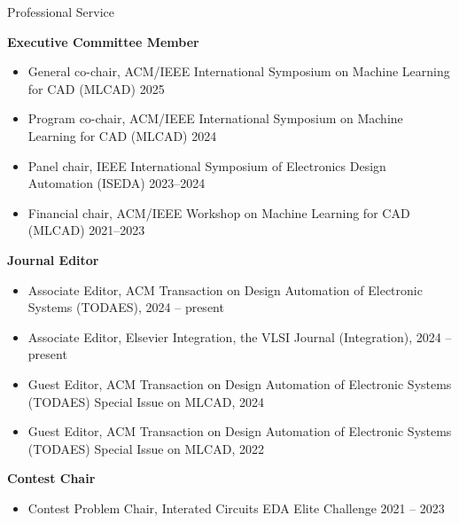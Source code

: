 
\begin{rSection}{Professional Service}

\textbf{Executive Committee Member}
\begin{itemize}
    \item General co-chair, ACM/IEEE International Symposium on Machine Learning for CAD (MLCAD) 2025
    \item Program co-chair, ACM/IEEE International Symposium on Machine Learning for CAD (MLCAD) 2024
    \item Panel chair, IEEE International Symposium of Electronics Design Automation (ISEDA) 2023--2024
    \item Financial chair, ACM/IEEE Workshop on Machine Learning for CAD (MLCAD) 2021--2023 
\end{itemize}

\textbf{Journal Editor}
\begin{itemize}
    \item Associate Editor, ACM Transaction on Design Automation of Electronic Systems (TODAES), 2024 -- present
    \item Associate Editor, Elsevier Integration, the VLSI Journal (Integration), 2024 -- present
    \item Guest Editor, ACM Transaction on Design Automation of Electronic Systems (TODAES) Special Issue on MLCAD, 2024
    \item Guest Editor, ACM Transaction on Design Automation of Electronic Systems (TODAES) Special Issue on MLCAD, 2022
\end{itemize}

\textbf{Contest Chair}
\begin{itemize}
    \item Contest Problem Chair, Interated Circuits EDA Elite Challenge 2021 -- 2023
\end{itemize}


\end{rSection}
